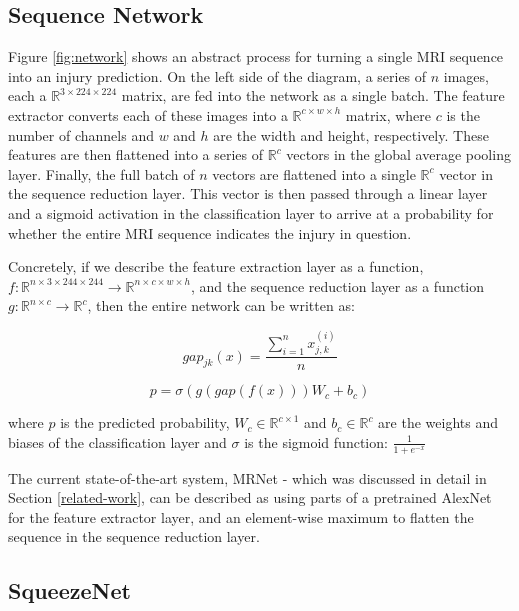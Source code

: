 \documentclass[10pt,twocolumn,letterpaper]{article}
\begin{document}
\subsection{Sequence Network}

Figure \ref{fig:network} shows an abstract process for turning a single MRI sequence into an injury prediction. On the left side of the diagram, a series of $n$ images, each a $\mathbb{R}^{3 \times 224 \times 224}$ matrix, are fed into the network as a single batch. The feature extractor converts each of these images into a $\mathbb{R}^{c \times w \times h}$ matrix, where $c$ is the number of channels and $w$ and $h$ are the width and height, respectively. These features are then flattened into a series of $\mathbb{R}^c$ vectors in the global average pooling layer. Finally, the full batch of $n$ vectors are flattened into a single $\mathbb{R}^c$ vector in the sequence reduction layer. This vector is then passed through a linear layer and a sigmoid activation in the classification layer to arrive at a probability for whether the entire MRI sequence indicates the injury in question.

Concretely, if we describe the feature extraction layer as a function, $f: \mathbb{R}^{n \times 3 \times 244 \times 244} \rightarrow \mathbb{R}^{n \times c \times w \times h}$, and the sequence reduction layer as a function $g: \mathbb{R}^{n \times c} \rightarrow \mathbb{R}^c$, then the entire network can be written as:

$$ gap_{jk}(x) = \frac{\sum_{i=1}^n x_{j,k}^{(i)}}{n} $$

\begin{equation}
\label{eq:network}
p = \sigma(g(gap(f(x))) W_c + b_c)
\end{equation}

where $p$ is the predicted probability, $W_c \in \mathbb{R}^{c \times 1}$ and $b_c \in \mathbb{R}^c$ are the weights and biases of the classification layer and $\sigma$ is the sigmoid function: $\frac{1}{1 + e^{-x}}$

The current state-of-the-art system, MRNet - which was discussed in detail in Section \ref{related-work}, can be described as using parts of a pretrained AlexNet for the feature extractor layer, and an element-wise maximum to flatten the sequence in the sequence reduction layer.

\subsection{SqueezeNet}
\end{document}
